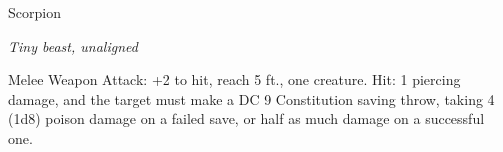 \begin{monsterbox}{Scorpion}
\begin{hangingpar}
\textit{Tiny beast, unaligned}
\end{hangingpar}
\dndline%
\basics[%
armorclass = 11,
hitpoints = 1d4 - 1,
speed = {10 ft.}
]
\dndline%
\stats[%
STR = \stat{2},
DEX = \stat{11},
CON = \stat{8},
INT = \stat{1},
WIS = \stat{8},
CHA = \stat{2}
]
\dndline%
\details[%
skills={},
damageimmunities={},
savingthrows={},
conditionimmunities={},
damageresistances={},
damagevulnerabilities={},
senses={blindsight 10 ft., passive Perception 9},
challenge=0
]
\dndline%
\begin{monsteraction}[Sting]
Melee Weapon Attack: +2 to hit, reach 5 ft., one creature. Hit: 1 piercing damage, and the target must make a DC 9 Constitution saving throw, taking 4 (1d8) poison damage on a failed save, or half as much damage on a successful one.
\end{monsteraction}
\end{monsterbox}